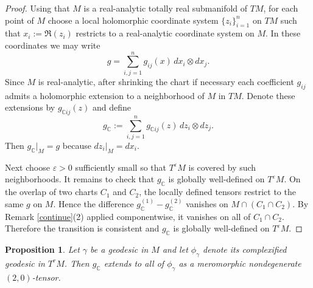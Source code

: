 \documentclass[a4paper, 12pt]{article}
\newcommand{\bC}{\mathbb{C}}
\newcommand{\gC}{g_{\mathbb{C}}}
\newtheorem{prop}[thm]{Proposition}
\begin{document}
\begin{proof}
Using that $M$ is a real-analytic totally real submanifold of $TM$, for each point of $M$ choose a local holomorphic coordinate system $\{z_i\}_{i=1}^n$ on $TM$ such that $x_i:=\Re(z_i)$ restricts to a real-analytic coordinate system on $M$.
In these coordinates we may write
\[
g=\sum_{i,j=1}^n g_{ij}(x)\,dx_i\otimes dx_j.
\]
Since $M$ is real-analytic, after shrinking the chart if necessary each coefficient $g_{ij}$ admits a holomorphic extension to a neighborhood of $M$ in $TM$. Denote these extensions by $g_{\bC ij}(z)$ and define
\[
\gC:=\sum_{i,j=1}^n g_{\bC ij}(z)\,dz_i\otimes dz_j.
\]
Then $\gC|_M=g$ because $dz_i|_M=dx_i$.

Next choose $\varepsilon>0$ sufficiently small so that $T^\varepsilon M$ is covered by such neighborhoods. It remains to check that $\gC$ is globally well-defined on $T^\varepsilon M$. On the overlap of two charts $C_1$ and $C_2$, the locally defined tensors restrict to the same $g$ on $M$. Hence the difference $\gC^{(1)}-\gC^{(2)}$ vanishes on $M\cap(C_1\cap C_2)$. By Remark \ref{continue}(2) applied componentwise, it vanishes on all of $C_1\cap C_2$. Therefore the transition is consistent and $\gC$ is globally well-defined on $T^\varepsilon M$.
\end{proof}

\begin{prop}\label{leafwise}
Let $\gamma$ be a geodesic in $M$ and let $\phi_\gamma$ denote its complexified geodesic in $T^rM$. Then $\gC$ extends to all of $\phi_\gamma$ as a meromorphic nondegenerate $(2,0)$-tensor.
\end{prop}
\end{document}
